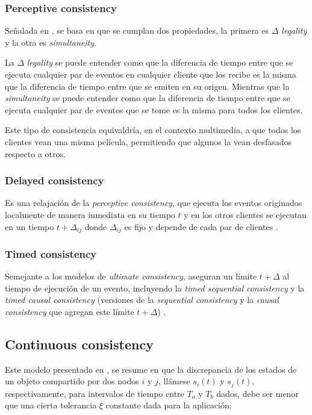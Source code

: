 \subsubsection{Perceptive consistency}

Señalada en \cite{bouillot2005fast}, se basa en que se cumplan dos propiedades, la primera es $\Delta$ \emph{legality} y la otra es \emph{simultaneity}.

La $\Delta$ \emph{legality} se puede entender como que la diferencia de tiempo entre que se ejecuta cualquier par de eventos en cualquier cliente que los recibe es la misma que la diferencia de tiempo entre que se emiten en su origen. Mientras que la \emph{simultaneity} se puede entender como que la diferencia de tiempo entre que se ejecuta cualquier par de eventos que se tome es la misma para todos los clientes.

Este tipo de consistencia equivaldría, en el contexto multimedia, a que todos los clientes vean una misma película, permitiendo que algunos la vean desfasados respecto a otros.

\subsubsection{Delayed consistency}

Es una relajación de la \emph{perceptive consistency}, que ejecuta los eventos originados localmente de manera inmediata en su tiempo $t$ y en los otros clientes se ejecutan en un tiempo $t+\Delta_{ij}$ donde $\Delta_{ij}$ es fijo y depende de cada par de clientes \cite{qin2002delayed}.

\subsubsection{Timed consistency}

Semejante a los modelos de \emph{ultimate consistency}, aseguran un límite $t+\Delta$ al tiempo de ejecución de un evento, incluyendo la \emph{timed sequential consistency} y la \emph{timed causal consistency} (versiones de la \emph{sequential consistency} y la \emph{causal consistency} que agregan este límite $t+\Delta$) \cite{torres1999timed}.

\subsection{Continuous consistency}

Este modelo presentado en \cite{li2004supporting}, se resume en que la discrepancia de los estados de un objeto compartido por dos nodos $i$ y $j$, llámese $s_i(t)$ y $s_j(t)$, respectivamente, para intervalos de tiempo entre $T_a$ y $T_b$ dados, debe ser menor que una cierta tolerancia $\xi$ constante dada para la aplicación:

